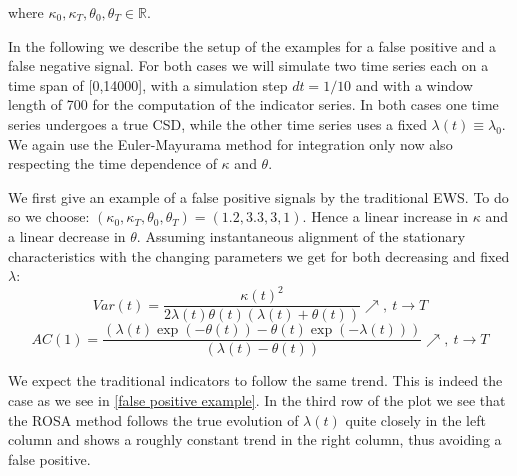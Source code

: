 \documentclass[%
thesis=student,%
coverpage=false,%
titlepage=false,%
headmarks=true, %
english,%
font=libertine, %
math=newpxtx, %
BCOR=5mm,%
coverBCOR=11mm%
]{tumbook}
\begin{document}
where $\kappa_{0},\kappa_{T},\theta_{0},\theta_{T} \in \mathbb{R}$. 

In the following we describe the setup of the examples for a false positive and a false negative signal. For both cases we will simulate two time series each on a time span of [0,14000], with a simulation step $dt = 1/10$ and with a window length of 700 for the computation of the indicator series. In both cases one time series undergoes a true CSD, while the other time series uses a fixed $\lambda(t) \equiv \lambda_{0}$. We again use the Euler-Mayurama method for integration only now also respecting the time dependence of $\kappa$ and $\theta$.

We first give an example of a false positive signals by the traditional EWS. To do so we choose: $(\kappa_{0},\kappa_{T},\theta_{0},\theta_{T}) = (1.2,3.3,3,1)$. Hence a linear increase in $\kappa$ and a linear decrease in $\theta$. Assuming instantaneous alignment of the stationary characteristics with the changing parameters we get for both decreasing and fixed $\lambda$: 
\[
Var(t) = \frac{\kappa(t)^2}{2\lambda(t)\theta(t)(\lambda(t) + \theta(t))} \nearrow, \ t \rightarrow T
\]
\[
AC(1) = \frac{(\lambda(t)\exp(-\theta(t))-\theta(t)\exp(-\lambda(t)))}{(\lambda(t)-\theta(t))} \nearrow, \ t \rightarrow T
\]

We expect the traditional indicators to follow the same trend. This is indeed the case as we see in \ref{false positive example}. In the third row of the plot we see that the ROSA method follows the true evolution of $\lambda(t)$ quite closely in the left column and shows a roughly constant trend in the right column, thus avoiding a false positive.
\end{document}
